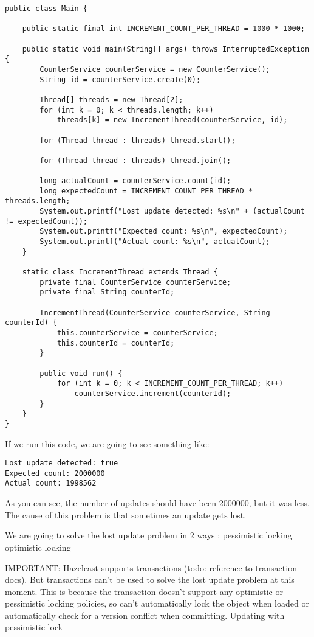\begin{verbatim}
public class Main {

    public static final int INCREMENT_COUNT_PER_THREAD = 1000 * 1000;

    public static void main(String[] args) throws InterruptedException {
        CounterService counterService = new CounterService();
        String id = counterService.create(0);

        Thread[] threads = new Thread[2];
        for (int k = 0; k < threads.length; k++)
            threads[k] = new IncrementThread(counterService, id);

        for (Thread thread : threads) thread.start();

        for (Thread thread : threads) thread.join();

        long actualCount = counterService.count(id);
        long expectedCount = INCREMENT_COUNT_PER_THREAD * threads.length;
        System.out.printf("Lost update detected: %s\n" + (actualCount != expectedCount));
        System.out.printf("Expected count: %s\n", expectedCount);
        System.out.printf("Actual count: %s\n", actualCount);
    }

    static class IncrementThread extends Thread {
        private final CounterService counterService;
        private final String counterId;

        IncrementThread(CounterService counterService, String counterId) {
            this.counterService = counterService;
            this.counterId = counterId;
        }

        public void run() {
            for (int k = 0; k < INCREMENT_COUNT_PER_THREAD; k++)
                counterService.increment(counterId);
        }
    }
}
\end{verbatim}

If we run this code, we are going to see something like:

\begin{verbatim}
Lost update detected: true
Expected count: 2000000
Actual count: 1998562
\end{verbatim}

As you can see, the number of updates should have been 2000000, but it was less. The cause of this problem is that sometimes an update gets lost.

We are going to solve the lost update problem in 2 ways :
pessimistic locking
optimistic locking

IMPORTANT: Hazelcast supports transactions (todo: reference to transaction docs). But transactions can't be used to solve the lost update problem at this moment. This is because the transaction doesn't support any optimistic or pessimistic locking policies, so can't automatically lock the object when loaded or automatically check for a version conflict when committing.
Updating with pessimistic lock

